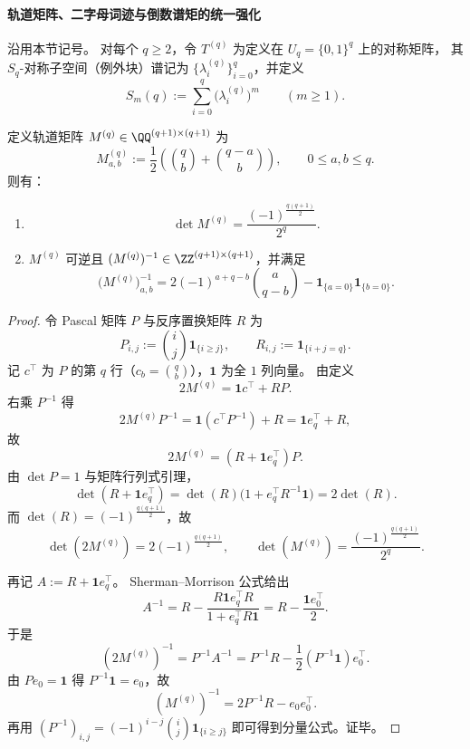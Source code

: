 \paragraph{轨道矩阵、二字母词迹与倒数谱矩的统一强化}
沿用本节记号。
对每个 \(q\ge 2\)，令 \(T^{(q)}\) 为定义在 \(U_q=\{0,1\}^q\) 上的对称矩阵，
其 \(S_q\)-对称子空间（例外块）谱记为
\(\{\lambda_i^{(q)}\}_{i=0}^{q}\)，并定义
\[
S_m(q):=\sum_{i=0}^{q}\bigl(\lambda_i^{(q)}\bigr)^m\qquad(m\ge 1).
\]

\begin{theorem}[例外谱轨道矩阵的行列式闭式与整逆性]\label{thm:xi-replica-softcore-orbit-matrix-determinant-integral-inverse}
定义轨道矩阵 \(M^{(q)}\in\QQ^{(q+1)\times(q+1)}\) 为
\[
M^{(q)}_{a,b}:=\frac12\!\left(\binom{q}{b}+\binom{q-a}{b}\right),
\qquad 0\le a,b\le q.
\]
则有：
\begin{enumerate}
  \item \[
  \det M^{(q)}=\frac{(-1)^{\frac{q(q+1)}2}}{2^q}.
  \]
  \item \(M^{(q)}\) 可逆且 \((M^{(q)})^{-1}\in\ZZ^{(q+1)\times(q+1)}\)，并满足
  \[
  \bigl(M^{(q)}\bigr)^{-1}_{a,b}
  =2(-1)^{a+q-b}\binom{a}{q-b}-\mathbf{1}_{\{a=0\}}\mathbf{1}_{\{b=0\}}.
  \]
\end{enumerate}
\end{theorem}
\begin{proof}
令 Pascal 矩阵 \(P\) 与反序置换矩阵 \(R\) 为
\[
P_{i,j}:=\binom{i}{j}\mathbf{1}_{\{i\ge j\}},
\qquad
R_{i,j}:=\mathbf{1}_{\{i+j=q\}}.
\]
记 \(c^\top\) 为 \(P\) 的第 \(q\) 行（\(c_b=\binom qb\)），\(\mathbf1\) 为全 \(1\) 列向量。
由定义
\[
2M^{(q)}=\mathbf1 c^\top+RP.
\]
右乘 \(P^{-1}\) 得
\[
2M^{(q)}P^{-1}
=\mathbf1(c^\top P^{-1})+R
=\mathbf1 e_q^\top+R,
\]
故
\[
2M^{(q)}=(R+\mathbf1 e_q^\top)P.
\]
由 \(\det P=1\) 与矩阵行列式引理，
\[
\det(R+\mathbf1 e_q^\top)
=\det(R)\bigl(1+e_q^\top R^{-1}\mathbf1\bigr)
=2\det(R).
\]
而 \(\det(R)=(-1)^{\frac{q(q+1)}2}\)，故
\[
\det(2M^{(q)})=2(-1)^{\frac{q(q+1)}2},
\qquad
\det(M^{(q)})=\frac{(-1)^{\frac{q(q+1)}2}}{2^q}.
\]

再记 \(A:=R+\mathbf1 e_q^\top\)。
Sherman--Morrison 公式给出
\[
A^{-1}
=R-\frac{R\mathbf1 e_q^\top R}{1+e_q^\top R\mathbf1}
=R-\frac{\mathbf1 e_0^\top}{2}.
\]
于是
\[
(2M^{(q)})^{-1}=P^{-1}A^{-1}
=P^{-1}R-\frac12(P^{-1}\mathbf1)e_0^\top.
\]
由 \(Pe_0=\mathbf1\) 得 \(P^{-1}\mathbf1=e_0\)，故
\[
(M^{(q)})^{-1}=2P^{-1}R-e_0e_0^\top.
\]
再用
\(
(P^{-1})_{i,j}=(-1)^{i-j}\binom{i}{j}\mathbf1_{\{i\ge j\}}
\)
即可得到分量公式。证毕。
\end{proof}

